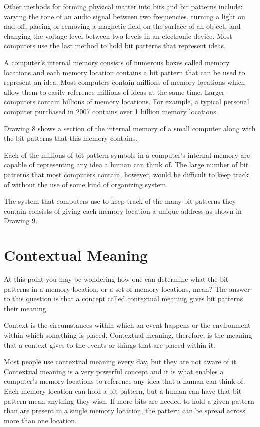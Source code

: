 \documentclass[12pt,oneside]{book}
\begin{document}
Other methods for forming physical matter into bits and bit patterns include: varying the tone of an audio signal between two frequencies, turning a light on and off, placing or removing a magnetic field on the surface of an object, and changing the voltage level between two levels in an electronic device. Most computers use the last method to hold bit patterns that represent ideas. 

A computer's internal memory consists of numerous {\textquotedbl}boxes{\textquotedbl} called memory locations and each memory location contains a bit pattern that can be used to represent an idea. Most computers contain millions of memory locations which allow them to easily reference millions of ideas at the same time. Larger computers contain billions of memory locations. For example, a typical personal computer purchased in 2007 contains over 1 billion memory locations.  

Drawing 8 shows a section of the internal memory of a small computer along with the bit patterns that this memory contains. 


Each of the millions of bit pattern symbols in a computer's internal memory are capable of representing any idea a human can think of. The large number of bit patterns that most computers contain, however, would be difficult to keep track of without the use of some kind of organizing system.


The system that computers use to keep track of the many bit patterns they contain consists of giving each memory location a unique address as shown in Drawing 9. 

\section[Contextual Meaning]{Contextual Meaning}

At this point you may be wondering {\textquotedbl}how one can determine what the bit patterns in a memory location, or a set of memory locations, mean?{\textquotedbl} The answer to this question is that a concept called contextual meaning gives bit patterns their meaning. 

Context is the circumstances within which an event happens or the environment within which something is placed. Contextual meaning, therefore, is the meaning that a context gives to the events or things that are placed within it.


Most people use contextual meaning every day, but they are not aware of it. Contextual meaning is a very powerful concept and it is what enables a computer's memory locations to reference any idea that a human can think of. Each memory location can hold a bit pattern, but a human can have that bit pattern mean anything they wish. If more bits are needed to hold a given pattern than are present in a single memory location, the pattern can be spread across more than one location.
\end{document}
